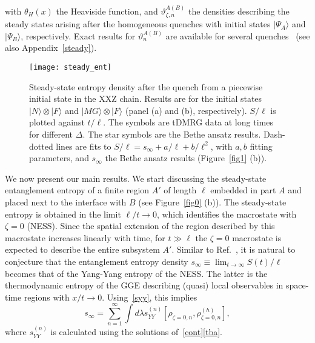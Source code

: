 \documentclass[twocolumn,superscriptaddress,prb,10pt]{revtex4-1}
\begin{document}
%
with $\theta_H(x)$ the Heaviside function, and $\vartheta_{\zeta,n}^{A(B)}$ the densities 
describing the steady states arising after the homogeneous quenches with initial states 
$|\Psi_A\rangle$ and $|\Psi_B\rangle$, respectively. Exact results for $\vartheta_n^{\scriptscriptstyle A(B)}$ are available for several 
quenches~\cite{caux-2013,wouters-2014A,pozsgay-2014A,bse-14,dwbc-14,bucciantini-15,
ac-16,pce-16,piroli-2016,mestyan-2015,brockmann-2014,iqdb-15,piroli-2016a,bpc-16,
caux-2016} (see also Appendix~\ref{steady}). 
%
\begin{figure}[t]
\texttt{[image: steady\_ent]}
\caption{ Steady-state entropy density after the quench 
 from a piecewise initial state in the XXZ chain. Results 
 are for the initial states $|N\rangle\otimes|
 F\rangle$ and $|MG\rangle\otimes|F\rangle$ (panel (a) and (b), 
 respectively). $S/\ell$ is plotted against $t/\ell$. The symbols are tDMRG 
 data at long times for different $\Delta$. The star symbols are the 
 Bethe ansatz results. Dash-dotted lines are fits to $S/\ell= s_\infty+
 a/\ell+b/\ell^2$, with $a,b$ fitting parameters, and $s_\infty$ the 
 Bethe ansatz results (Figure~\ref{fig1} (b)). 
}
\label{fig2}
\end{figure}
%
We now present our main results. We start discussing the steady-state 
entanglement entropy of a finite region $A'$ of length $\ell$ embedded in part $A$ and 
placed next to the interface with $B$ (see Figure~\ref{fig0} (b)). 
The steady-state entropy is obtained in the limit $\ell/t\to 0$, which identifies the macrostate 
with $\zeta=0$ (NESS). Since the spatial extension of the region described by this macrostate increases 
linearly with time, for $t\gg \ell$ the $\zeta=0$  macrostate is expected to 
describe the entire subsystem $A'$. Similar to Ref.~, it is 
natural to conjecture that the entanglement entropy density $s_\infty\equiv\lim_{t\to\infty}S(t)/\ell$ 
becomes that of the Yang-Yang entropy of the NESS. The latter is the thermodynamic entropy of the 
GGE describing (quasi) local observables in space-time regions with $x/t\to0$. Using~\eqref{syy}, 
this implies  
%
\begin{equation}
\label{conj}
s_\infty=\sum_{n=1}^\infty\int d\lambda s^{\scriptscriptstyle(n)}_{YY}[
\rho_{\zeta=0,n},\rho_{\zeta=0,n}^{\scriptscriptstyle(h)}], 
\end{equation}
%
where $s^{\scriptscriptstyle(n)}_{YY}$ is calculated using the solutions of~\eqref{cont}\eqref{tba}. 
\end{document}
